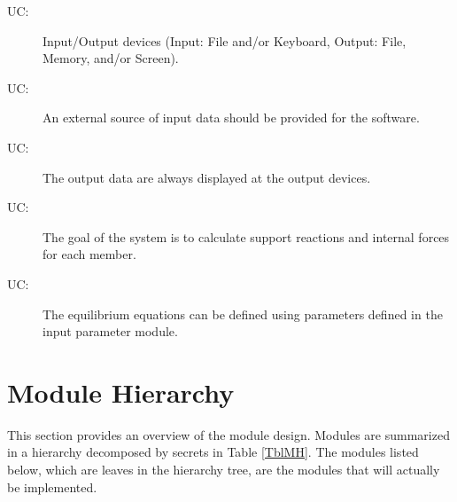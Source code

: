 \documentclass[12pt, titlepage]{article}
\newcounter{ucnum}
\newcommand{\uctheucnum}{UC\theucnum}
\begin{document}
\begin{description}
\item[ \uctheucnum \label{ucIO}:] Input/Output devices
  (Input: File and/or Keyboard, Output: File, Memory, and/or Screen).
  \item[ \uctheucnum \label{ucExternalIn}:] 
  An external source of input data should be provided for the software.
  \item[ \uctheucnum \label{ucDispaly}:] The output data are always displayed at the output devices.
  \item[ \uctheucnum \label{ucGoal}:] The goal of the system is to calculate support reactions and internal forces for each member.
  \item[ \uctheucnum \label{ucGoal}:] The equilibrium equations can be defined using parameters defined in the input parameter module. 

\end{description}

\section{Module Hierarchy} \label{SecMH}

This section provides an overview of the module design. Modules are summarized
in a hierarchy decomposed by secrets in Table \ref{TblMH}. The modules listed
below, which are leaves in the hierarchy tree, are the modules that will
actually be implemented.
\end{document}
